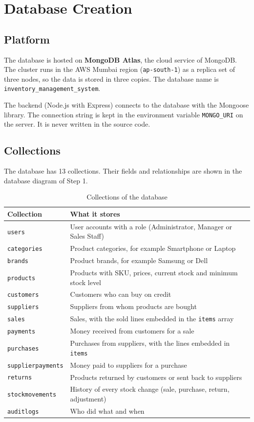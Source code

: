 \documentclass[11pt,a4paper]{article}
\newcommand{\code}[1]{\texttt{#1}}
\begin{document}
\section{Database Creation}

\subsection{Platform}
The database is hosted on \textbf{MongoDB Atlas}, the cloud service of MongoDB. The cluster runs in the AWS Mumbai region (\code{ap-south-1}) as a replica set of three nodes, so the data is stored in three copies. The database name is \code{inventory\_management\_system}.

The backend (Node.js with Express) connects to the database with the Mongoose library. The connection string is kept in the environment variable \code{MONGO\_URI} on the server. It is never written in the source code.

\subsection{Collections}
The database has 13 collections. Their fields and relationships are shown in the database diagram of Step 1.

\begin{table}[h]
\centering
\begin{tabularx}{\textwidth}{@{}P{3.4cm}Y@{}}
\toprule
\textbf{Collection} & \textbf{What it stores} \\
\midrule
\code{users} & User accounts with a role (Administrator, Manager or Sales Staff) \\
\code{categories} & Product categories, for example Smartphone or Laptop \\
\code{brands} & Product brands, for example Samsung or Dell \\
\code{products} & Products with SKU, prices, current stock and minimum stock level \\
\code{customers} & Customers who can buy on credit \\
\code{suppliers} & Suppliers from whom products are bought \\
\code{sales} & Sales, with the sold lines embedded in the \code{items} array \\
\code{payments} & Money received from customers for a sale \\
\code{purchases} & Purchases from suppliers, with the lines embedded in \code{items} \\
\code{supplierpayments} & Money paid to suppliers for a purchase \\
\code{returns} & Products returned by customers or sent back to suppliers \\
\code{stockmovements} & History of every stock change (sale, purchase, return, adjustment) \\
\code{auditlogs} & Who did what and when \\
\bottomrule
\end{tabularx}
\caption{Collections of the database}
\end{table}
\end{document}
